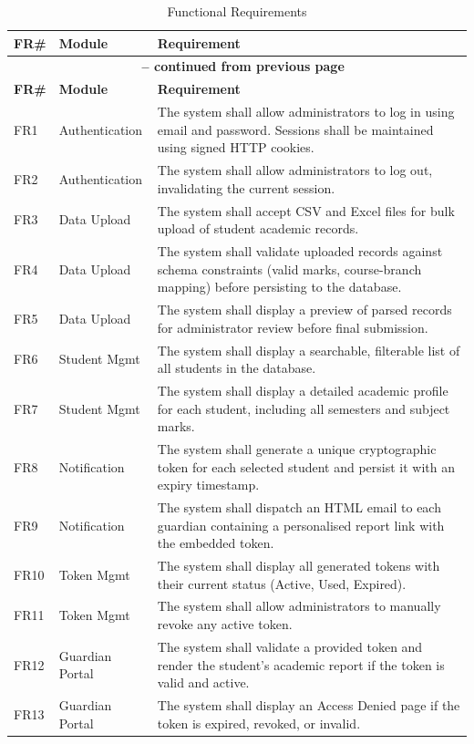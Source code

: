\documentclass[12pt,a4paper]{report}
\begin{document}
\begin{longtable}{|p{1cm}|p{3cm}|p{9cm}|}
\caption{Functional Requirements} \\
\hline
\textbf{FR\#} & \textbf{Module} & \textbf{Requirement}\\
\hline
\endfirsthead
\multicolumn{3}{c}{{\bfseries \tablename\ \thetable{} -- continued from previous page}} \\
\hline
\textbf{FR\#} & \textbf{Module} & \textbf{Requirement}\\
\hline
\endhead
FR1 & Authentication & The system shall allow administrators to log in using email and password. Sessions shall be maintained using signed HTTP cookies.\\
\hline
FR2 & Authentication & The system shall allow administrators to log out, invalidating the current session.\\
\hline
FR3 & Data Upload & The system shall accept CSV and Excel files for bulk upload of student academic records.\\
\hline
FR4 & Data Upload & The system shall validate uploaded records against schema constraints (valid marks, course-branch mapping) before persisting to the database.\\
\hline
FR5 & Data Upload & The system shall display a preview of parsed records for administrator review before final submission.\\
\hline
FR6 & Student Mgmt & The system shall display a searchable, filterable list of all students in the database.\\
\hline
FR7 & Student Mgmt & The system shall display a detailed academic profile for each student, including all semesters and subject marks.\\
\hline
FR8 & Notification & The system shall generate a unique cryptographic token for each selected student and persist it with an expiry timestamp.\\
\hline
FR9 & Notification & The system shall dispatch an HTML email to each guardian containing a personalised report link with the embedded token.\\
\hline
FR10 & Token Mgmt & The system shall display all generated tokens with their current status (Active, Used, Expired).\\
\hline
FR11 & Token Mgmt & The system shall allow administrators to manually revoke any active token.\\
\hline
FR12 & Guardian Portal & The system shall validate a provided token and render the student's academic report if the token is valid and active.\\
\hline
FR13 & Guardian Portal & The system shall display an Access Denied page if the token is expired, revoked, or invalid.\\
\hline
\end{longtable}
\end{document}
